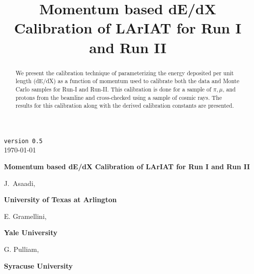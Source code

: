 \documentclass[a4paper]{article}
\title{Momentum based dE/dX Calibration of LArIAT for Run I and Run II}
\begin{document}
\def\Journal#1#2#3#4{{#1} {\bf #2}, #3 (#4)}
\def\etal{{\it et\ al.}}
\def\numunue{\nu_\mu\rightarrow\nu_e}
\def\numunutau{\nu_\mu\rightarrow\nu_\tau}
\def\nuebar{\bar\nu_e}
\def\nue{\nu_e}
\def\nutau{\nu_\tau}
\def\numubar{\bar\nu_\mu}
\def\numu{\nu_\mu}
\def\ra{\rightarrow}
\def\numubarnuebar{\bar\nu_\mu\rightarrow\bar\nu_e}
\def\nuebarnumubar{\bar\nu_e\rightarrow\bar\nu_\mu}
\def\osc{\rightsquigarrow}
\def\inteni{{\cal I}_{pot}}
\def\fmerit{{\cal F}}
\begin{flushright}
{\tt version 0.5}\\ 
\today
\end{flushright}
\vspace*{0.6cm}
\begin{center}
{\Large \bf Momentum based dE/dX Calibration of LArIAT for Run I and Run II} 
\vspace*{1.6cm}
\setcounter{footnote}{0}  
\def\A{\kern+.6ex\lower.42ex\hbox{$\scriptstyle \iota$}\kern-1.20ex a}
\def\E{\kern+.5ex\lower.42ex\hbox{$\scriptstyle \iota$}\kern-1.10ex e}
\small
\newcommand{\Aname}[2]{#1}
\def\titlefoot#1{\vspace{-0.3cm}\begin{center}{\bf #1}\end{center}}

\Aname{J.~Asaadi}{UTA},

\titlefoot{University of Texas at Arlington\label{UTA}}

\Aname{E. Gramellini}{Yale},

\titlefoot{Yale University\label{Yale}}

\Aname{G. Pulliam}{Syracuse},

\titlefoot{Syracuse University\label{Syracuse}}

\end{center}
\vspace*{1cm}


\begin{abstract}

We present the calibration technique of parameterizing the energy deposited per unit length (dE/dX) as a function of momentum used to calibrate both the data and Monte Carlo samples for Run-I and Run-II. This calibration is done for a sample of $\pi, \mu$, and protons from the beamline and cross-checked using a sample of cosmic rays. The results for this calibration along with the derived calibration constants are presented.

\end{abstract} 
\end{document}
